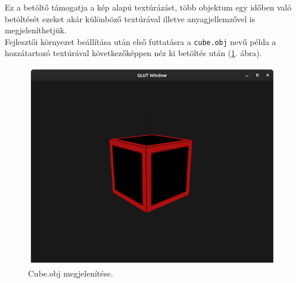 Ez a betöltő támogatja a kép alapú textúrázást, több objektum egy időben való betöltését  ezeket akár különböző textúrával illetve anyagjellemzővel is megjeleníthetjük.\\

Fejlesztői környezet beállítása után első futtatásra a \texttt{cube.obj} nevű példa a hozzátartozó textúrával következőképpen néz ki betöltés után (\ref{fig:model1}. ábra).
\bigskip
\begin{figure}[h]
\centering
\includegraphics[width=\textwidth]{images/Model_loader.png}
\caption{Cube.obj megjelenítése.}
\label{fig:model1}
\end{figure}
\bigskip

